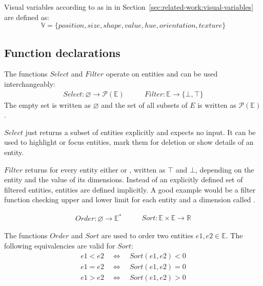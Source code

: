 Visual variables according to \textcite{Bertin2010} as in in Section~\ref{sec:related-work:visual-variables} are defined as:
\begin{equation} \mathbb{V} = \{position, size, shape, value, hue, orientation, texture\} \end{equation}


\subsection{Function declarations}
The functions $Select$ and $Filter$ operate on entities and can be used interchangeably:
\begin{equation}
\begin{split} Select: \varnothing \rightarrow \mathcal{P}(\mathbb{E}) \end{split}\qquad
\begin{split} Filter: \mathbb{E} \rightarrow \{ \bot, \top \} \end{split}
\end{equation}
  The empty set is written as $\varnothing$ and the set of all subsets of $E$ is written as $ \mathcal{P}(\mathbb{E})$.

  $Select$ just returns a subset of entities explicitly and expects no input.
  It can be used to highlight or focus entities, mark them for deletion or show details of an entity.

  $Filter$ returns for every entity either  or , written as $\top$ and $\bot$, depending on the entity and the value of its dimensions.
  Instead of an explicitly defined set of filtered entities, entities are defined implicitly.
  A good example would be a filter function checking upper and lower limit for each entity and a dimension called .

\begin{equation}
\begin{split} Order: \varnothing \rightarrow \mathbb{E}^* \end{split}\qquad
\begin{split} Sort:  \mathbb{E} \times \mathbb{E} \rightarrow \mathbb{R} \end{split}
\end{equation}

  The functions $Order$ and $Sort$ are used to order two entities $e1, e2 \in \mathbb{E}$.
  The following equivalencies are valid for $Sort$:
  \begin{align*}
     e1 < e2 \quad\Leftrightarrow\quad Sort(e1,e2) < 0 \\
     e1 = e2 \quad\Leftrightarrow\quad Sort(e1,e2) = 0 \\
     e1 > e2 \quad\Leftrightarrow\quad Sort(e1,e2) > 0
  \end{align*}

